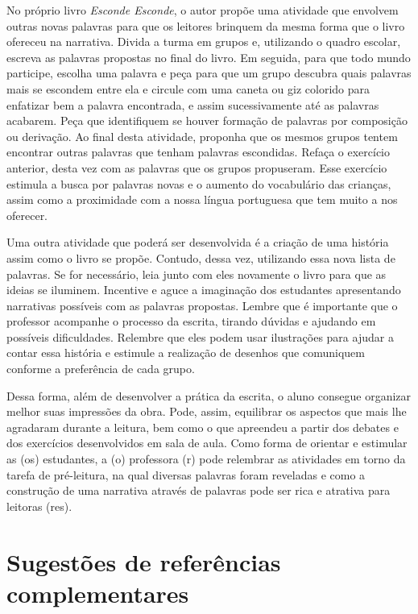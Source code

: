 \documentclass[11pt]{extarticle}
\begin{document}
No próprio livro \textit{Esconde Esconde}, o autor propõe uma atividade que envolvem outras novas palavras para que os leitores brinquem da mesma forma que o livro ofereceu na narrativa. Divida a turma em grupos e, utilizando o quadro escolar, escreva as palavras propostas no final do livro. Em seguida, para que todo mundo participe, escolha uma palavra e peça para que um grupo descubra quais palavras mais se escondem entre ela e circule com uma caneta ou giz colorido para enfatizar bem a palavra encontrada, e assim sucessivamente até as palavras acabarem. Peça que identifiquem se houver formação de palavras por composição ou derivação. Ao final desta atividade, proponha que os mesmos grupos tentem encontrar outras palavras que tenham palavras escondidas. Refaça o exercício anterior, desta vez com as palavras que os grupos propuseram. Esse exercício estimula a busca por palavras novas e o aumento do vocabulário das crianças, assim como a proximidade com a nossa língua portuguesa que tem muito a nos oferecer.

Uma outra atividade que poderá ser desenvolvida é a criação de uma história assim como o livro se propõe. Contudo, dessa vez, utilizando essa nova lista de palavras. Se for necessário, leia junto com eles novamente o livro para que as ideias se iluminem. Incentive e aguce a imaginação dos estudantes apresentando narrativas possíveis com as palavras propostas. Lembre que é importante que o professor acompanhe o processo da escrita, tirando dúvidas e ajudando em possíveis dificuldades. Relembre que eles podem usar ilustrações para ajudar a contar essa história e estimule a realização de desenhos que comuniquem conforme a preferência de cada grupo.

Dessa forma, além de desenvolver a prática da escrita, o aluno consegue organizar melhor suas impressões da obra. Pode, assim, equilibrar os aspectos que mais lhe agradaram durante a leitura, bem como o que apreendeu a partir dos debates e dos exercícios desenvolvidos em sala de aula. Como forma de orientar e estimular as (os) estudantes, a (o) professora (r) pode relembrar as atividades em torno da tarefa de pré-leitura, na qual diversas palavras foram reveladas e como a construção de uma narrativa através de palavras pode ser rica e atrativa para leitoras (res).

\section{Sugestões de referências complementares}
\end{document}
